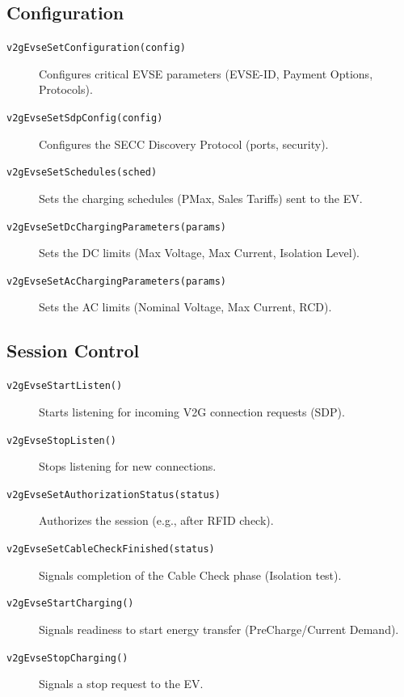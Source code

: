 \documentclass[a4paper,11pt]{report}
\begin{document}
\subsection{Configuration}
\begin{description}
    \item[\texttt{v2gEvseSetConfiguration(config)}] Configures critical EVSE parameters (EVSE-ID, Payment Options, Protocols).
    \item[\texttt{v2gEvseSetSdpConfig(config)}] Configures the SECC Discovery Protocol (ports, security).
    \item[\texttt{v2gEvseSetSchedules(sched)}] Sets the charging schedules (PMax, Sales Tariffs) sent to the EV.
    \item[\texttt{v2gEvseSetDcChargingParameters(params)}] Sets the DC limits (Max Voltage, Max Current, Isolation Level).
    \item[\texttt{v2gEvseSetAcChargingParameters(params)}] Sets the AC limits (Nominal Voltage, Max Current, RCD).
\end{description}

\subsection{Session Control}
\begin{description}
    \item[\texttt{v2gEvseStartListen()}] Starts listening for incoming V2G connection requests (SDP).
    \item[\texttt{v2gEvseStopListen()}] Stops listening for new connections.
    \item[\texttt{v2gEvseSetAuthorizationStatus(status)}] Authorizes the session (e.g., after RFID check).
    \item[\texttt{v2gEvseSetCableCheckFinished(status)}] Signals completion of the Cable Check phase (Isolation test).
    \item[\texttt{v2gEvseStartCharging()}] Signals readiness to start energy transfer (PreCharge/Current Demand).
    \item[\texttt{v2gEvseStopCharging()}] Signals a stop request to the EV.
\end{description}
\end{document}
